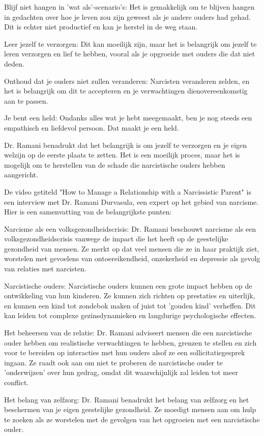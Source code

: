 Blijf niet hangen in 'wat als'-scenario's: Het is gemakkelijk om te blijven hangen in gedachten over hoe je leven zou zijn geweest als je andere ouders had gehad. Dit is echter niet productief en kan je herstel in de weg staan.

Leer jezelf te verzorgen: Dit kan moeilijk zijn, maar het is belangrijk om jezelf te leren verzorgen en lief te hebben, vooral als je opgroeide met ouders die dat niet deden.

Onthoud dat je ouders niet zullen veranderen: Narcisten veranderen zelden, en het is belangrijk om dit te accepteren en je verwachtingen dienovereenkomstig aan te passen.

Je bent een held: Ondanks alles wat je hebt meegemaakt, ben je nog steeds een empathisch en liefdevol persoon. Dat maakt je een held.

Dr. Ramani benadrukt dat het belangrijk is om jezelf te verzorgen en je eigen welzijn op de eerste plaats te zetten. Het is een moeilijk proces, maar het is mogelijk om te herstellen van de schade die narcistische ouders hebben aangericht.

De video getiteld "How to Manage a Relationship with a Narcissistic Parent" is een interview met Dr. Ramani Durvasula, een expert op het gebied van narcisme. Hier is een samenvatting van de belangrijkste punten:

Narcisme als een volksgezondheidscrisis: Dr. Ramani beschouwt narcisme als een volksgezondheidscrisis vanwege de impact die het heeft op de geestelijke gezondheid van mensen. Ze merkt op dat veel mensen die ze in haar praktijk ziet, worstelen met gevoelens van ontoereikendheid, onzekerheid en depressie als gevolg van relaties met narcisten.

Narcistische ouders: Narcistische ouders kunnen een grote impact hebben op de ontwikkeling van hun kinderen. Ze kunnen zich richten op prestaties en uiterlijk, en kunnen een kind tot zondebok maken of juist tot 'gouden kind' verheffen. Dit kan leiden tot complexe gezinsdynamieken en langdurige psychologische effecten.

Het beheersen van de relatie: Dr. Ramani adviseert mensen die een narcistische ouder hebben om realistische verwachtingen te hebben, grenzen te stellen en zich voor te bereiden op interacties met hun ouders alsof ze een sollicitatiegesprek ingaan. Ze raadt ook aan om niet te proberen de narcistische ouder te 'onderwijzen' over hun gedrag, omdat dit waarschijnlijk zal leiden tot meer conflict.

Het belang van zelfzorg: Dr. Ramani benadrukt het belang van zelfzorg en het beschermen van je eigen geestelijke gezondheid. Ze moedigt mensen aan om hulp te zoeken als ze worstelen met de gevolgen van het opgroeien met een narcistische ouder.

